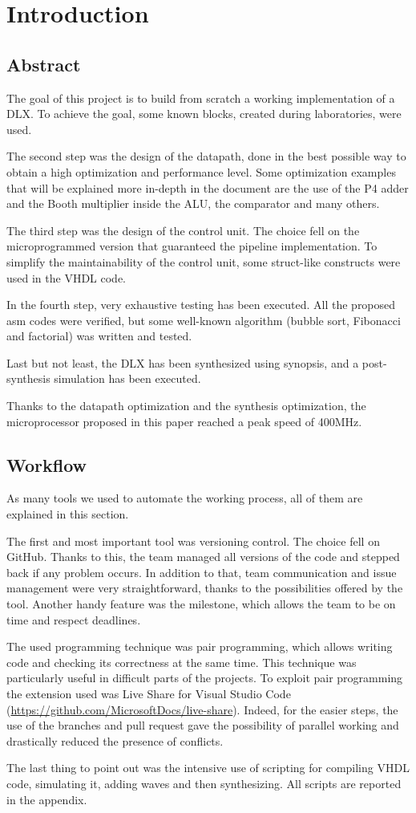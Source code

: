 \chapter{Introduction}

\section{Abstract}
The goal of this project is to build from scratch a working implementation of a DLX. To achieve the goal, some known blocks, created during laboratories, were used. 

The second step was the design of the datapath, done in the best possible way to obtain a high optimization and performance level. Some optimization examples that will be explained more in-depth in the document are the use of the P4 adder and the Booth multiplier inside the ALU, the comparator and many others. 

The third step was the design of the control unit. The choice fell on the microprogrammed version that guaranteed the pipeline implementation. To simplify the maintainability of the control unit, some struct-like constructs were used in the VHDL code. 

In the fourth step, very exhaustive testing has been executed. All the proposed asm codes were verified, but some well-known algorithm (bubble sort, Fibonacci and factorial) was written and tested.

Last but not least, the DLX has been synthesized using synopsis, and a post-synthesis simulation has been executed. 

Thanks to the datapath optimization and the synthesis optimization, the microprocessor proposed in this paper reached a peak speed of 400MHz.  
\section{Workflow}
As many tools we used to automate the working process, all of them are explained in this section.

The first and most important tool was versioning control. The choice fell on GitHub. Thanks to this, the team managed all versions of the code and stepped back if any problem occurs. In addition to that, team communication and issue management were very straightforward, thanks to the possibilities offered by the tool. Another handy feature was the milestone, which allows the team to be on time and respect deadlines. 

The used programming technique was pair programming, which allows writing code and checking its correctness at the same time. This technique was particularly useful in difficult parts of the projects. To exploit pair programming the extension used was Live Share for Visual Studio Code (\url{https://github.com/MicrosoftDocs/live-share}). Indeed, for the easier steps, the use of the branches and pull request gave the possibility of parallel working and drastically reduced the presence of conflicts. 

The last thing to point out was the intensive use of scripting for compiling VHDL code, simulating it, adding waves and then synthesizing. All scripts are reported in the appendix.